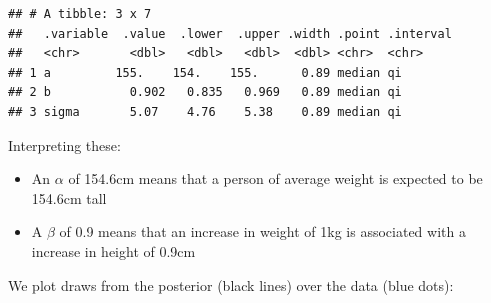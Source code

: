 \documentclass[
]{book}
\newenvironment{Shaded}{\begin{snugshade}}{\end{snugshade}}
\newcommand{\AttributeTok}[1]{\textcolor[rgb]{0.77,0.63,0.00}{#1}}
\newcommand{\DecValTok}[1]{\textcolor[rgb]{0.00,0.00,0.81}{#1}}
\newcommand{\FloatTok}[1]{\textcolor[rgb]{0.00,0.00,0.81}{#1}}
\newcommand{\FunctionTok}[1]{\textcolor[rgb]{0.00,0.00,0.00}{#1}}
\newcommand{\NormalTok}[1]{#1}
\newcommand{\OtherTok}[1]{\textcolor[rgb]{0.56,0.35,0.01}{#1}}
\newcommand{\SpecialCharTok}[1]{\textcolor[rgb]{0.00,0.00,0.00}{#1}}
\providecommand{\tightlist}{%
  \setlength{\itemsep}{0pt}\setlength{\parskip}{0pt}}
\begin{document}
\begin{Shaded}
\end{Shaded}

\begin{verbatim}
## # A tibble: 3 x 7
##   .variable  .value  .lower  .upper .width .point .interval
##   <chr>       <dbl>   <dbl>   <dbl>  <dbl> <chr>  <chr>    
## 1 a         155.    154.    155.      0.89 median qi       
## 2 b           0.902   0.835   0.969   0.89 median qi       
## 3 sigma       5.07    4.76    5.38    0.89 median qi
\end{verbatim}

Interpreting these:

\begin{itemize}
\tightlist
\item
  An \(\alpha\) of 154.6cm means that a person of average weight is expected to be 154.6cm tall
\item
  A \(\beta\) of 0.9 means that an increase in weight of 1kg is associated with a increase in height of 0.9cm
\end{itemize}

We plot draws from the posterior (black lines) over the data (blue dots):
\end{document}
